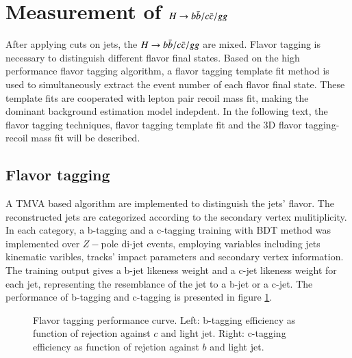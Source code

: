 \section{Measurement of $H\rightarrow b\bar{b}/c\bar{c}/gg$}\label{sec:templatefit}
After applying cuts on jets, the $H\rightarrow b\bar{b}/c\bar{c}/gg$ are mixed. 
Flavor tagging is necessary to distinguish different flavor final states. 
Based on the high performance flavor tagging algorithm, 
a flavor tagging template fit method is used to simultaneously extract the 
event number of each flavor final state. 
These template fits are cooperated with 
lepton pair recoil mass fit, making the dominant background estimation  
model indepdent. In the following text, the flavor tagging techniques, 
flavor tagging template fit and the 3D flavor tagging-recoil mass fit will 
be described.
\subsection{Flavor tagging}\label{subsec:flavortagging}
 A TMVA based algorithm are implemented to distinguish the jets' flavor. 
 The reconstructed jets are categorized according to the secondary vertex mulitiplicity. 
 In each category, a b-tagging and a c-tagging training with BDT method was implemented over $Z-$pole di-jet events, employing variables including jets kinematic varibles, tracks' impact parameters and secondary vertex information. The training output gives a b-jet likeness weight and a c-jet likeness weight for each jet, representing the resemblance of the jet to a b-jet or a c-jet. The performance of b-tagging and c-tagging is presented in figure \ref{fig:FT_performance}. 
\begin{figure}[!htpb]
\label{fig:FT_performance}
\centering
{}
\caption{Flavor tagging performance curve. Left: b-tagging efficiency as function of rejection against $c$ and light jet. Right: c-tagging efficiency as function of rejetion against $b$ and light jet.}
\end{figure}

 
